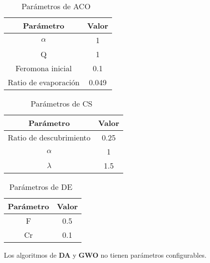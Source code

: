 \begin{table}[H]
    \centering
    \begin{tabular}{ c c }
        \hline
        \textbf{Parámetro}   & \textbf{Valor} \\
        \hline
        $\alpha$             & 1              \\
        Q                    & 1              \\
        Feromona inicial     & 0.1            \\
        Ratio de evaporación & 0.049          \\
        \hline
    \end{tabular}
    \caption{Parámetros de ACO~\cite{kashef_advanced_2015}}
\end{table}

\begin{table}[H]
    \centering
    \begin{tabular}{ c c }
        \hline
        \textbf{Parámetro}      & \textbf{Valor} \\
        \hline
        Ratio de descubrimiento & 0.25           \\
        $\alpha$                & 1              \\
        $\lambda$               & 1.5            \\
        \hline
    \end{tabular}
    \caption{Parámetros de CS~\cite{rodrigues_bcs_2013}}
\end{table}

\begin{table}[H]
    \centering
    \begin{tabular}{ c c }
        \hline
        \textbf{Parámetro} & \textbf{Valor} \\
        \hline
        F                  & 0.5            \\
        Cr                 & 0.1            \\
        \hline
    \end{tabular}
    \caption{Parámetros de DE~\cite{storn_differential_1997}}
\end{table}

Los algoritmos de \textbf{DA} y \textbf{GWO} no tienen parámetros configurables.